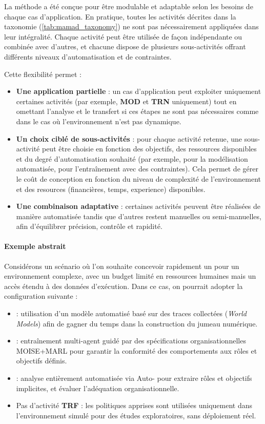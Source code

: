 

La méthode  a été conçue pour être modulable et adaptable selon les besoins de chaque cas d'application.
En pratique, toutes les activités décrites dans la taxonomie (\autoref{tab:mamad_taxonomy}) ne sont pas nécessairement appliquées dans leur intégralité.
Chaque activité peut être utilisée de façon indépendante ou combinée avec d'autres, et chacune dispose de plusieurs sous-activités offrant différents niveaux d'automatisation et de contraintes.

Cette flexibilité permet :
\begin{itemize}
    \item \textbf{Une application partielle} : un cas d'application peut exploiter uniquement certaines activités (par exemple, \textbf{MOD} et \textbf{TRN} uniquement) tout en omettant l'analyse et le transfert si ces étapes ne sont pas nécessaires comme dans le cas où l'environnement n'est pas dynamique.
    \item \textbf{Un choix ciblé de sous-activités} : pour chaque activité retenue, une sous-activité peut être choisie en fonction des objectifs, des ressources disponibles et du degré d'automatisation souhaité (par exemple,  pour la modélisation automatisée,  pour l'entraînement avec des contraintes). Cela permet de gérer le coût de conception en fonction du niveau de complexité de l'environnement et des resources (financières, temps, experience) disponibles.
    \item \textbf{Une combinaison adaptative} : certaines activités peuvent être réalisées de manière automatisée tandis que d'autres restent manuelles ou semi-manuelles, afin d'équilibrer précision, contrôle et rapidité.
\end{itemize}

\paragraph{Exemple abstrait}
Considérons un scénario où l'on souhaite concevoir rapidement un  pour un environnement complexe, avec un budget limité en ressources humaines mais un accès étendu à des données d'exécution.
Dans ce cas, on pourrait adopter la configuration suivante :
\begin{itemize}
    \item {} : utilisation d'un modèle automatisé basé sur des traces collectées (\textit{World Models}) afin de gagner du temps dans la construction du jumeau numérique.
    \item {} : entraînement multi-agent guidé par des spécifications organisationnelles MOISE+MARL pour garantir la conformité des comportements aux rôles et objectifs définis.
    \item {} : analyse entièrement automatisée via Auto- pour extraire rôles et objectifs implicites, et évaluer l'adéquation organisationnelle.
    \item Pas d'activité \textbf{TRF} : les politiques apprises sont utilisées uniquement dans l'environnement simulé pour des études exploratoires, sans déploiement réel.
\end{itemize}

